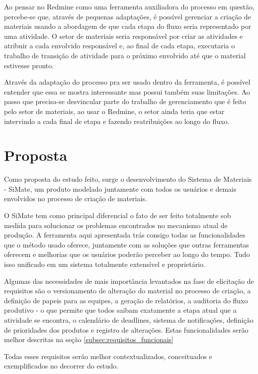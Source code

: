 Ao pensar no Redmine como uma ferramenta auxiliadora do processo em questão, percebe-se que, através de pequenas adaptações, é possível gerenciar a criação de materiais usando a abordagem de que cada etapa do fluxo seria representado por uma atividade. O setor de materiais seria responsável por criar as atividades e atribuir a cada envolvido responsável e, ao final de cada etapa, executaria o trabalho de transição de atividade para o próximo envolvido até que o material estivesse pronto.

Através da adaptação do processo pra ser usado dentro da ferramenta, é possível entender que essa se mostra interessante mas possui também suas limitações. Ao passo que precisa-se desvincular parte do trabalho de gerenciamento que é feito pelo setor de materiais, ao usar o Redmine, o setor ainda teria que estar intervindo a cada final de etapa e fazendo reatribuições ao longo do fluxo.

\section{Proposta}

Como proposta do estudo feito, surge o desenvolvimento do Sistema de Materiais - SiMate, um produto modelado juntamente com todos os usuários e demais envolvidos no processo de criação de materiais.

O SiMate tem como principal diferencial o fato de ser feito totalmente sob medida para solucionar os problemas encontrados no mecanismo atual de produção. A ferramenta aqui apresentada trás consigo todas as funcionalidades que o método usado oferece, juntamente com as soluções que outras ferramentas oferecem e melhorias que os usuários poderão perceber ao longo do tempo. Tudo isso unificado em um sistema totalmente extensível e proprietário.

Algumas das necessidades de mais importância levantados na fase de elicitação de requisitos são o versionamento de alteração do material no processo de criação, a definição de papeis para as equipes, a geração de relatórios, a auditoria do fluxo produtivo - o que permite que todos saibam exatamente a etapa atual que a atividade se encontra, o calendário de deadlines, sistema de notificações, definição de prioridades dos produtos e registro de alterações. Estas funcionalidades serão melhor descritas na seção \hyperref[subsec:requisitos_funcionais]{\ref{subsec:requisitos_funcionais}}

Todas esses requisitos serão melhor contextualizados, conceituados e exemplificados no decorrer do estudo.

